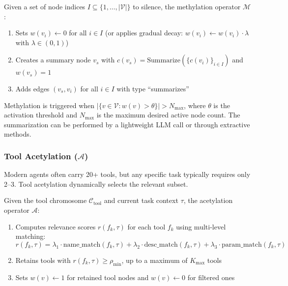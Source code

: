\begin{definition}
Given a set of node indices $I \subseteq \{1, \ldots, |\mathcal{V}|\}$ to silence, the methylation operator $\mathcal{M}$:
\begin{enumerate}
    \item Sets $w(v_i) \leftarrow 0$ for all $i \in I$ (or applies gradual decay: $w(v_i) \leftarrow w(v_i) \cdot \lambda$ with $\lambda \in (0, 1)$)
    \item Creates a summary node $v_s$ with $c(v_s) = \text{Summarize}(\{c(v_i)\}_{i \in I})$ and $w(v_s) = 1$
    \item Adds edges $(v_s, v_i)$ for all $i \in I$ with type ``summarizes''
\end{enumerate}
\end{definition}

Methylation is triggered when $|\{v \in \mathcal{V} : w(v) > \theta\}| > N_{\text{max}}$, where $\theta$ is the activation threshold and $N_{\text{max}}$ is the maximum desired active node count. The summarization can be performed by a lightweight LLM call or through extractive methods.

\subsubsection{Tool Acetylation ($\mathcal{A}$)}

Modern agents often carry 20+ tools, but any specific task typically requires only 2--3. Tool acetylation dynamically selects the relevant subset.

\begin{definition}
Given the tool chromosome $\mathcal{C}_{\text{tool}}$ and current task context $\tau$, the acetylation operator $\mathcal{A}$:
\begin{enumerate}
    \item Computes relevance scores $r(f_k, \tau)$ for each tool $f_k$ using multi-level matching:
    \begin{equation}
        r(f_k, \tau) = \lambda_1 \cdot \text{name\_match}(f_k, \tau) + \lambda_2 \cdot \text{desc\_match}(f_k, \tau) + \lambda_3 \cdot \text{param\_match}(f_k, \tau)
    \end{equation}
    \item Retains tools with $r(f_k, \tau) \geq \rho_{\text{min}}$, up to a maximum of $K_{\text{max}}$ tools
    \item Sets $w(v) \leftarrow 1$ for retained tool nodes and $w(v) \leftarrow 0$ for filtered ones
\end{enumerate}
\end{definition}

